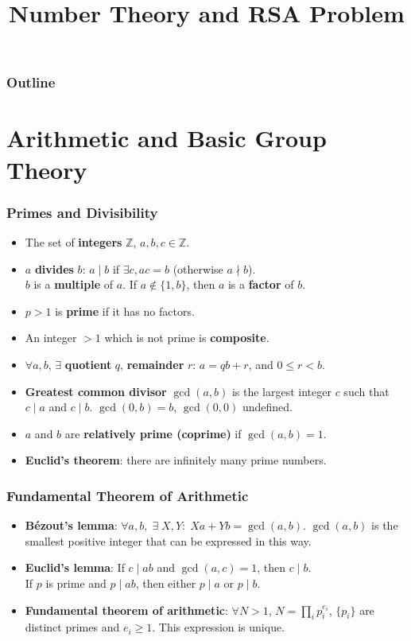 

\title{Number Theory and RSA Problem}


\maketitle
\begin{frame}
\frametitle{Outline}
\tableofcontents
\end{frame}
%
\section{Arithmetic and Basic Group Theory}
\begin{frame}\frametitle{Primes and Divisibility}
\begin{itemize}
\item The set of \textbf{integers} $\mathbb{Z}$, $a,b,c \in \mathbb{Z}$.
\item $a$ \textbf{divides} $b$: $a \mid b$ if $\exists c, ac=b$ (otherwise $a \nmid b$). \\$b$ is a \textbf{multiple} of $a$. If $a \notin \{1,b\}$, then $a$ is a \textbf{factor} of $b$. 
\item $p > 1$ is \textbf{prime} if it has no factors.
\item An integer $>1$ which is not prime is \textbf{composite}.
\item $\forall a,b$, $\exists$ \textbf{quotient} $q$, \textbf{remainder} $r$: $a=qb+r$, and $0\le r < b$.
\item \textbf{Greatest common divisor} $\gcd(a,b)$ is the largest integer $c$ such that $c\mid a$ and $c\mid b$. $\gcd(0,b)=b$, $\gcd(0,0)$ undefined.
\item $a$ and $b$ are \textbf{relatively prime (coprime)} if $\gcd(a,b)=1$.
\item \textbf{Euclid's theorem}: there are infinitely many prime numbers.
\end{itemize}
\end{frame}
\begin{frame}\frametitle{Fundamental Theorem of Arithmetic}
\begin{itemize}
\item \textbf{B\'{e}zout's lemma}: $\forall a,b,\;\exists\;X,Y:\;Xa+Yb=\gcd(a,b)$. $\gcd(a,b)$ is the smallest positive integer that can be expressed in this way.
\item \textbf{Euclid's lemma}: If $c \mid ab$ and $\gcd(a,c)=1$, then $c \mid b$. \\
If $p$ is prime and $p\mid ab$, then either $p \mid a$ or $p \mid b$.
\item \textbf{Fundamental theorem of arithmetic}: $\forall N >1$, $N = \prod _i p_i^{e_i}$, $\{p_i\}$ are distinct primes and $e_i \ge 1$. This expression is unique.
\end{itemize}
\end{frame}
